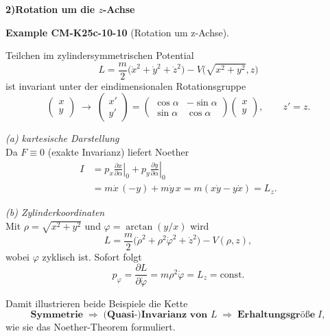 \documentclass[10pt, letterpaper]{article}
\newcommand{\CustomHeading}[3]{%
  \par\medskip\noindent%
  \textbf{#1 #2} \textnormal{(#3)}.\enskip%
}
\newenvironment{EXA}[2]{\begin{unitbox}\CustomHeading{Example}{#1}{#2}}{\end{unitbox}}
\begin{document}
\textbf{2)\;Rotation um die $z$-Achse}\\


\begin{EXA}{CM-K25c-10-10}{Rotation um z-Achse}
Teilchen im zylindersymmetrischen Potential
\[
  L=\frac{m}{2}\bigl(\dot x^{2}+\dot y^{2}+\dot z^{2}\bigr)
     -V\bigl(\sqrt{x^{2}+y^{2}},z\bigr)
\]
ist invariant unter der eindimensionalen Rotationsgruppe
\[
  \begin{pmatrix}x\\y\end{pmatrix}
  \;\longrightarrow\;
  \begin{pmatrix}
    x'\\[4pt] y'
  \end{pmatrix}
  =
  \begin{pmatrix}
    \cos\alpha & -\sin\alpha\\
    \sin\alpha &  \cos\alpha
  \end{pmatrix}
  \begin{pmatrix}x\\y\end{pmatrix},
  \qquad
  z'=z .
\]
\end{EXA}



\emph{(a) kartesische Darstellung}\\
Da $F\equiv0$ (exakte Invarianz) liefert Noether
\[
\begin{aligned}
  I
  &=p_x\!\left.\frac{\partial x}{\partial\alpha}\right|_0
    +p_y\!\left.\frac{\partial y}{\partial\alpha}\right|_0\\
  &=
    m\dot x\,(-y)+m\dot y\,x
   =m(x\dot y-y\dot x)
   =L_z .
\end{aligned}
\]

\emph{(b) Zylinderkoordinaten}\\
Mit $\rho=\sqrt{x^{2}+y^{2}}$ und
$\varphi=\arctan(y/x)$ wird
\[
  L=\frac{m}{2}
     \bigl(\dot\rho^{2}+\rho^{2}\dot\varphi^{2}+\dot z^{2}\bigr)
     -V(\rho,z),
\]
wobei $\varphi$ zyklisch ist.  Sofort folgt
\[
  p_\varphi=\frac{\partial L}{\partial\dot\varphi}
           =m\rho^{2}\dot\varphi=L_z=\text{const}.
\]

\bigskip
\noindent
Damit illustrieren beide Beispiele die Kette
\[
  \textbf{Symmetrie} \;\Rightarrow\; 
  \textbf{(Quasi-)Invarianz von $L$} \;\Rightarrow\;
  \textbf{Erhaltungsgröße}\;I ,
\]
wie sie das Noether-Theorem formuliert.
\end{document}

